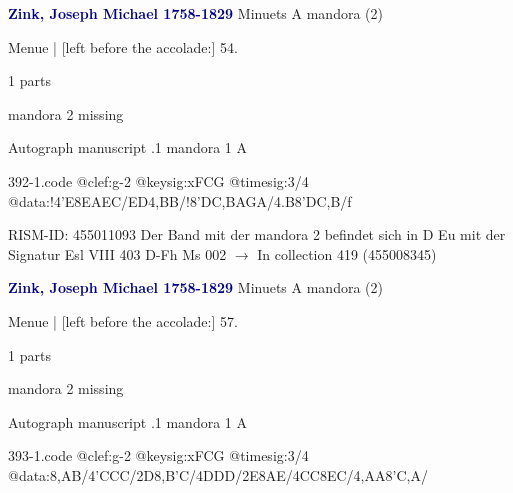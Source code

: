 \documentclass[twocolumn]{book}
\begin{document}
\newline \par \vspace{7pt} \textcolor{darkblue}{\textbf{Zink, Joseph Michael  1758-1829}}
\newline Minuets  A  
\newline mandora (2)
\newline \begin{itshape}[f.28v, at left:] Menue | [left before the accolade:] 54.\end{itshape} 
\newline \textcolor{darkblue}{}  1 parts  
\newline \begin{small} mandora 2 missing\end{small} 
\newline Autograph manuscript
.1  mandora 1  A  
\begin{filecontents*}{392-1.code}
@clef:g-2
@keysig:xFCG
@timesig:3/4
@data:!4'E{8EAEC}/{ED}4,BB/!{8'DC}{,BA}{GA}/4.B8'D{C,B}/f
\end{filecontents*}
\newline
%

\newline RISM-ID: 455011093
\newline Der Band mit der mandora 2 befindet sich in D Eu mit der Signatur Esl VIII 403
\newline D-Fh  Ms 002
\newline $\rightarrow$ In collection 419 (455008345)

\newline \par \vspace{7pt} \textcolor{darkblue}{\textbf{Zink, Joseph Michael  1758-1829}}
\newline Minuets  A  
\newline mandora (2)
\newline \begin{itshape}[f.30r, at left:] Menue | [left before the accolade:] 57.\end{itshape} 
\newline \textcolor{darkblue}{}  1 parts  
\newline \begin{small} mandora 2 missing\end{small} 
\newline Autograph manuscript
.1  mandora 1  A  
\begin{filecontents*}{393-1.code}
@clef:g-2
@keysig:xFCG
@timesig:3/4
@data:{8,AB}/4'CCC/2D{8,B'C}/4DDD/2E{8AE}/4CC{8EC}/4,AA{8'C,A}/
\end{filecontents*}
\newline
%
\end{document}

